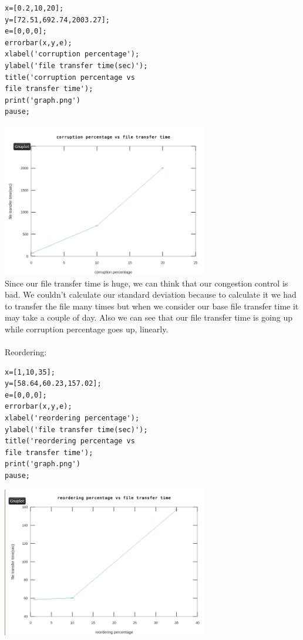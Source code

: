 \documentclass[conference]{IEEEtran}
\begin{document}
\begin{verbatim}
x=[0.2,10,20];
y=[72.51,692.74,2003.27];
e=[0,0,0];
errorbar(x,y,e);
xlabel('corruption percentage');
ylabel('file transfer time(sec)');
title('corruption percentage vs
file transfer time');
print('graph.png')
pause;
\end{verbatim}

\includegraphics[width=9cm,scale=0.25]{corrup.png}\\[0.1cm]

Since our file transfer time is huge, we can think that our congestion control is bad. We couldn't calculate our standard deviation because to calculate it we had to transfer the file many times but when we consider our base file transfer time it may take a couple of day. Also we can see that our file transfer time is going up while corruption percentage goes up, linearly.
\\
\\
Reordering:

\begin{verbatim}
x=[1,10,35];
y=[58.64,60.23,157.02];
e=[0,0,0];
errorbar(x,y,e);
xlabel('reordering percentage');
ylabel('file transfer time(sec)');
title('reordering percentage vs
file transfer time');
print('graph.png')
pause;
\end{verbatim}

\includegraphics[width=9cm,scale=0.25]{reorder.png}\\[0.1cm]
\end{document}
